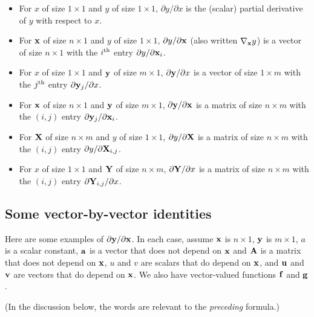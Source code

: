 \begin{itemize}

\item For $x$ of size $1\times 1$ and $y$ of size $1\times 1$,
  $\partial y/\partial x$ is the (scalar) partial derivative of $y$
  with respect to $x$.  

\item For ${\bf x}$ of size $n\times 1$ and $y$ of size $1\times 1$,
  $\partial y/\partial {\bf x}$ (also written $\nabla_{\bf x} y$) is a vector of
  size $n\times 1$ with the $i^{\rm th}$ entry $\partial y/\partial
  {\bf x}_i$. 

\item For $x$ of size $1\times 1$ and ${\bf y}$ of size $m\times 1$,
  $\partial {\bf y}/\partial x$ is a vector of size $1 \times m$ with the
  $j^{\rm th}$ entry $\partial {\bf y}_j/\partial x$.

\item For ${\bf x}$ of size $n\times 1$ and ${\bf y}$ of size $m\times 1$,
  $\partial {\bf y}/\partial {\bf x}$ is a matrix of size $n\times m$ with the
  $(i, j)$ entry $\partial {\bf y}_j/\partial {\bf x}_i$.
  
\item For ${\bf X}$ of size $n\times m$ and $y$ of size $1\times 1$,
  $\partial y/\partial {\bf X}$ is a matrix of size $n\times m$ with the
  $(i, j)$ entry $\partial y/\partial {\bf X}_{i, j}$.

\item For $x$ of size $1 \times 1$ and ${\bf Y}$ of size $n \times m$,
  $\partial {\bf Y} /\partial x$ is a matrix of size $n \times m$ with the
  $(i, j)$ entry $\partial {\bf Y}_{i,j} / \partial x$.

\end{itemize}


\subsection{Some vector-by-vector identities}
Here are some examples of $\partial {\bf y} / \partial {\bf x}$.  In each case,
assume ${\bf x}$ is $n \times 1$, ${\bf y}$ is $m \times 1$, $a$ is a scalar
constant, ${\bf a}$ is a vector that does not depend on ${\bf x}$ and ${\bf A}$ is a matrix that does
not depend on ${\bf x}$, $u$ and $v$ are scalars that do depend on ${\bf x}$, and
${\bf u}$ and ${\bf v}$ are vectors that do depend on ${\bf x}$.  We also have
vector-valued functions ${\bf f}$ and ${\bf g}$.

(In the discussion below, the words are relevant to the {\em
  preceding} formula.)

